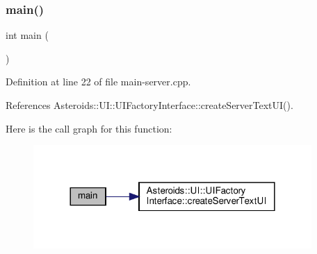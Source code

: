 \subsubsection{\texorpdfstring{main()}{main()}}
{\footnotesize\ttfamily int main (\begin{DoxyParamCaption}{ }\end{DoxyParamCaption})}



Definition at line 22 of file main-\/server.\+cpp.



References Asteroids\+::\+U\+I\+::\+U\+I\+Factory\+Interface\+::create\+Server\+Text\+U\+I().

Here is the call graph for this function\+:\nopagebreak
\begin{figure}[H]
\begin{center}
\leavevmode
\includegraphics[width=300pt]{main-server_8cpp_ae66f6b31b5ad750f1fe042a706a4e3d4_cgraph}
\end{center}
\end{figure}
